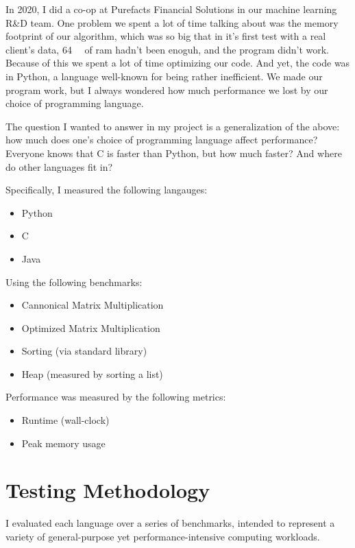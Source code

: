 \documentclass[12pt,letterpaper]{article}
\begin{document}
In 2020, I did a co-op at Purefacts Financial Solutions in our machine learning
R\&D team. One problem we spent a lot of time talking about was the memory
footprint of our algorithm, which was so big that in it's first test with a real
client's data, \SI{64}{\giga\byte} of ram hadn't been enoguh, and the program
didn't work. Because of this we spent a lot of time optimizing our code. And
yet, the code was in Python, a language well-known for being rather inefficient.
We made our program work, but I always wondered how much performance we lost by
our choice of programming language.

The question I wanted to answer in my project is a generalization of the above:
how much does one's choice of programming language affect performance? Everyone
knows that C is faster than Python, but how much faster? And where do other
languages fit in?

Specifically, I measured the following langauges:

\begin{itemize}
  \item Python
  \item C
  \item Java
\end{itemize}

Using the following benchmarks:

\begin{itemize}
  \item Cannonical Matrix Multiplication
  \item Optimized Matrix Multiplication
  \item Sorting (via standard library)
  \item Heap (measured by sorting a list)
\end{itemize}

Performance was measured by the following metrics:

\begin{itemize}
  \item Runtime (wall-clock)
  \item Peak memory usage
\end{itemize}

\section{Testing Methodology}

I evaluated each language over a series of benchmarks, intended to represent a
variety of general-purpose yet performance-intensive computing workloads.
\end{document}
